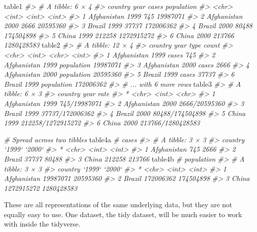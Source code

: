 \documentclass[]{book}
\newenvironment{Shaded}{\begin{snugshade}}{\end{snugshade}}
\newcommand{\CommentTok}[1]{\textcolor[rgb]{0.56,0.35,0.01}{\textit{{#1}}}}
\newcommand{\NormalTok}[1]{{#1}}
\begin{document}
\begin{Shaded}
\begin{Highlighting}[]
\NormalTok{table1}
\CommentTok{#> # A tibble: 6 × 4}
\CommentTok{#>       country  year  cases population}
\CommentTok{#>         <chr> <int>  <int>      <int>}
\CommentTok{#> 1 Afghanistan  1999    745   19987071}
\CommentTok{#> 2 Afghanistan  2000   2666   20595360}
\CommentTok{#> 3      Brazil  1999  37737  172006362}
\CommentTok{#> 4      Brazil  2000  80488  174504898}
\CommentTok{#> 5       China  1999 212258 1272915272}
\CommentTok{#> 6       China  2000 213766 1280428583}
\NormalTok{table2}
\CommentTok{#> # A tibble: 12 × 4}
\CommentTok{#>       country  year       type     count}
\CommentTok{#>         <chr> <int>      <chr>     <int>}
\CommentTok{#> 1 Afghanistan  1999      cases       745}
\CommentTok{#> 2 Afghanistan  1999 population  19987071}
\CommentTok{#> 3 Afghanistan  2000      cases      2666}
\CommentTok{#> 4 Afghanistan  2000 population  20595360}
\CommentTok{#> 5      Brazil  1999      cases     37737}
\CommentTok{#> 6      Brazil  1999 population 172006362}
\CommentTok{#> # ... with 6 more rows}
\NormalTok{table3}
\CommentTok{#> # A tibble: 6 × 3}
\CommentTok{#>       country  year              rate}
\CommentTok{#> *       <chr> <int>             <chr>}
\CommentTok{#> 1 Afghanistan  1999      745/19987071}
\CommentTok{#> 2 Afghanistan  2000     2666/20595360}
\CommentTok{#> 3      Brazil  1999   37737/172006362}
\CommentTok{#> 4      Brazil  2000   80488/174504898}
\CommentTok{#> 5       China  1999 212258/1272915272}
\CommentTok{#> 6       China  2000 213766/1280428583}

\CommentTok{# Spread across two tibbles}
\NormalTok{table4a  }\CommentTok{# cases}
\CommentTok{#> # A tibble: 3 × 3}
\CommentTok{#>       country `1999` `2000`}
\CommentTok{#> *       <chr>  <int>  <int>}
\CommentTok{#> 1 Afghanistan    745   2666}
\CommentTok{#> 2      Brazil  37737  80488}
\CommentTok{#> 3       China 212258 213766}
\NormalTok{table4b  }\CommentTok{# population}
\CommentTok{#> # A tibble: 3 × 3}
\CommentTok{#>       country     `1999`     `2000`}
\CommentTok{#> *       <chr>      <int>      <int>}
\CommentTok{#> 1 Afghanistan   19987071   20595360}
\CommentTok{#> 2      Brazil  172006362  174504898}
\CommentTok{#> 3       China 1272915272 1280428583}
\end{Highlighting}
\end{Shaded}

These are all representations of the same underlying data, but they are
not equally easy to use. One dataset, the tidy dataset, will be much
easier to work with inside the tidyverse.
\end{document}
